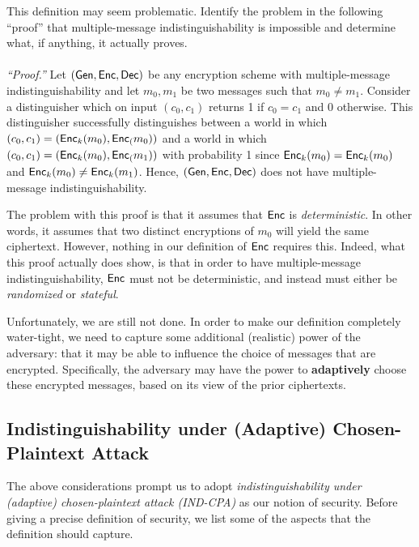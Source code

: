 \documentclass[11pt]{article}
\begin{document}
\begin{question}
    This definition may seem problematic. Identify the problem in the following ``proof''
    that multiple-message indistinguishability is impossible and determine what, if
    anything, it actually proves. \\ \\
    \emph{``Proof.''} Let \((\mathsf{Gen}, \mathsf{Enc}, \mathsf{Dec})\) be any encryption scheme with
    multiple-message indistinguishability and let \(m_0, m_1\) be two messages such that
    \(m_0 \neq m_1\). Consider a distinguisher which on input \((c_0, c_1)\) returns 1 if
    \(c_0 = c_1\) and 0 otherwise. This distinguisher successfully distinguishes between
    a world in which \((c_0, c_1) = (\mathsf{Enc}_k(m_0), \mathsf{Enc}_(m_0))\) and a world in
    which \((c_0, c_1) = (\mathsf{Enc}_k(m_0), \mathsf{Enc}_(m_1))\) with probability 1 since
    \(\mathsf{Enc}_k(m_0) = \mathsf{Enc}_k(m_0)\) and \(\mathsf{Enc}_k(m_0) \neq \mathsf{Enc}_k(m_1)\).
    Hence, \((\mathsf{Gen}, \mathsf{Enc}, \mathsf{Dec})\) does not have multiple-message
    indistinguishability. 
\end{question}
\begin{answer}
    The problem with this proof is that it assumes that \(\mathsf{Enc}\) is
    \emph{deterministic}. In other words, it assumes that two distinct encryptions of
    \(m_0\) will yield the same ciphertext. However, nothing in our definition of
    \(\mathsf{Enc}\) requires this. Indeed, what this proof actually does show, is that in
    order to have multiple-message indistinguishability, \(\mathsf{Enc}\) must not be
    deterministic, and instead must either be \emph{randomized} or \emph{stateful}.
\end{answer}

\vspace{\baselineskip}
Unfortunately, we are still not done.  In order to make our definition
completely water-tight, we need to capture some additional (realistic)
power of the adversary: that it may be able to influence the choice of
messages that are encrypted.  Specifically, the adversary may have the
power to \textbf{adaptively} choose these encrypted messages, based on
its view of the prior ciphertexts. 

\subsection{Indistinguishability under (Adaptive) Chosen-Plaintext Attack}
\label{sec:indist-under-chos}

The above considerations prompt us to adopt
\textit{indistinguishability under (adaptive) chosen-plaintext attack
  (IND-CPA)} as our notion of security.  Before giving a precise
definition of security, we list some of the aspects that the
definition should capture.
\end{document}
